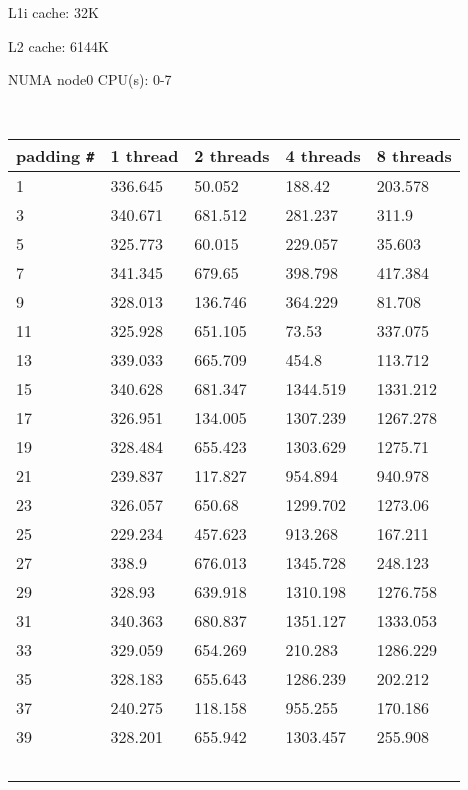 \documentclass[letterpaper,10pt]{article} %
\begin{document}
L1i cache:             32K

L2 cache:              6144K

NUMA node0 CPU(s):     0-7


\begin{figure} [ht]
	\centering
	
	\label{runtimes}
\end{figure}

\begin{table}  [ht]
	\centering
	    \begin{tabular}{lllll}
		padding \verb|#| & 1 thread & 2 threads & 4 threads & 8 threads\\ \hline
			 1 & 336.645 & 50.052 & 188.42 & 203.578\\ 
			 3 & 340.671 & 681.512 & 281.237 & 311.9\\ 
			 5 & 325.773 & 60.015 & 229.057 & 35.603\\ 
			 7 & 341.345 & 679.65 & 398.798 & 417.384\\ 
			 9 & 328.013 & 136.746 & 364.229 & 81.708\\ 
			11 & 325.928 & 651.105 & 73.53 & 337.075\\ 
			13 & 339.033 & 665.709 & 454.8 & 113.712\\ 
			15 & 340.628 & 681.347 & 1344.519 & 1331.212\\ 
			17 & 326.951 & 134.005 & 1307.239 & 1267.278\\ 
			19 & 328.484 & 655.423 & 1303.629 & 1275.71\\ 
			21 & 239.837 & 117.827 & 954.894 & 940.978\\ 
			23 & 326.057 & 650.68 & 1299.702 & 1273.06\\ 
			25 & 229.234 & 457.623 & 913.268 & 167.211\\ 
			27 & 338.9 & 676.013 & 1345.728 & 248.123\\ 
			29 & 328.93 & 639.918 & 1310.198 & 1276.758\\ 
			31 & 340.363 & 680.837 & 1351.127 & 1333.053\\ 
			33 & 329.059 & 654.269 & 210.283 & 1286.229\\ 
			35 & 328.183 & 655.643 & 1286.239 & 202.212\\ 
			37 & 240.275 & 118.158 & 955.255 & 170.186\\ 
			39 & 328.201 & 655.942 & 1303.457 & 255.908\\ 
		    \end{tabular}
	\end{table}

	
\end{document}
